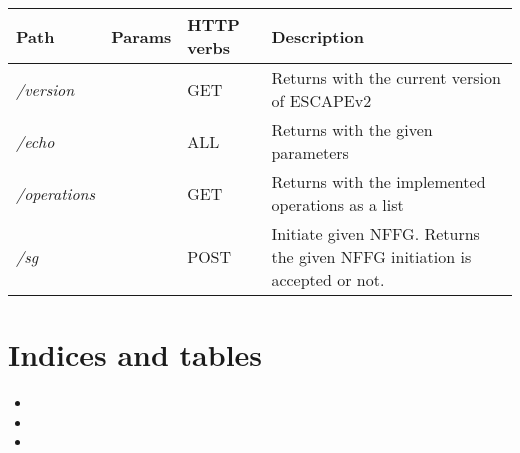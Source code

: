 \documentclass[letterpaper,10pt,english]{sphinxmanual}
\begin{document}
\begin{tabulary}{\linewidth}{|L|L|L|L|}
\hline
\textsf{\relax 
Path
} & \textsf{\relax 
Params
} & \textsf{\relax 
HTTP verbs
} & \textsf{\relax 
Description
}\\
\hline
\emph{/version}
 & 
 & 
GET
 & 
Returns with the current version of ESCAPEv2
\\
\hline
\emph{/echo}
 & 
 & 
ALL
 & 
Returns with the given parameters
\\
\hline
\emph{/operations}
 & 
 & 
GET
 & 
Returns with the implemented operations as a list
\\
\hline
\emph{/sg}
 & 
 & 
POST
 & 
Initiate given NFFG. Returns the given NFFG initiation is accepted or not.
\\
\hline\end{tabulary}



\chapter{Indices and tables}
\label{index:indices-and-tables}\begin{itemize}
\item {} 

\item {} 

\item {} 

\end{itemize}
\end{document}
